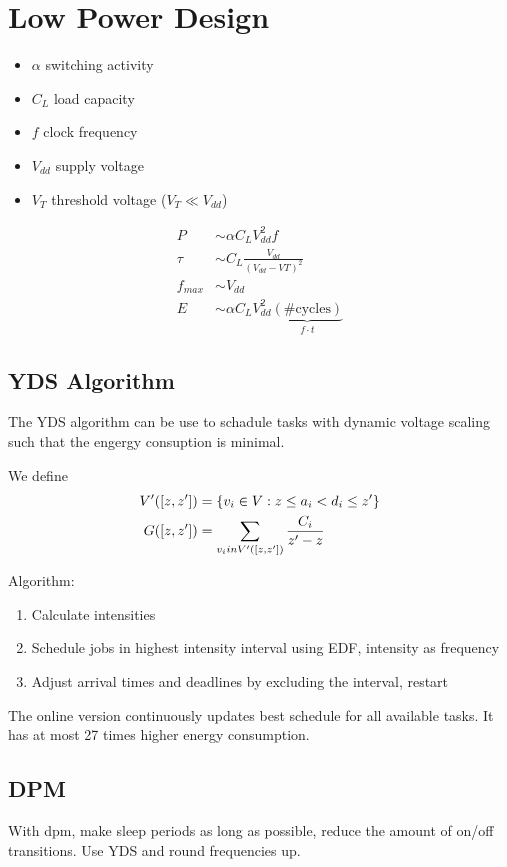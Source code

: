 \section{Low Power Design}
\begin{itemize}
	\item $\alpha$ switching activity
	\item $C_L$ load capacity
	\item $f$ clock frequency
	\item $V_{dd}$ supply voltage
	\item $V_T$ threshold voltage ($V_T \ll V_{dd}$)
\end{itemize}
\begin{align*}
	P &\sim \alpha C_L V_{dd}^2 f \\
	\tau &\sim C_L \frac{V_{dd}}{\left(V_{dd} - V{T}\right)^2} \\
	f_{max} &\sim V_{dd} \\
	E &\sim \alpha C_L V_{dd}^2 \underbrace{\left(\text{\#cycles}\right)}_{f \cdot t}
\end{align*}

\subsection{YDS Algorithm}
The YDS algorithm can be use to schadule tasks with dynamic voltage scaling such
that the engergy consuption is minimal.

We define
\begin{align*}
	V'([z, z']) &= \left\lbrace v_i \in V: z \leq a_i < d_i \leq z' \right\rbrace \\
	G([z, z']) &= \sum_{v_i in V'([z,z'])} \frac{C_i}{z' - z}
\end{align*}

Algorithm:
\begin{enumerate}
	\item Calculate intensities
	\item Schedule jobs in highest intensity interval using EDF, intensity as
		frequency
	\item Adjust arrival times and deadlines by excluding the interval, restart
\end{enumerate}

The online version continuously updates best schedule for all available tasks.
It has at most 27 times higher energy consumption.

\subsection{DPM}
With dpm, make sleep periods as long as possible, reduce the amount of on/off
transitions. Use YDS and round frequencies up.
